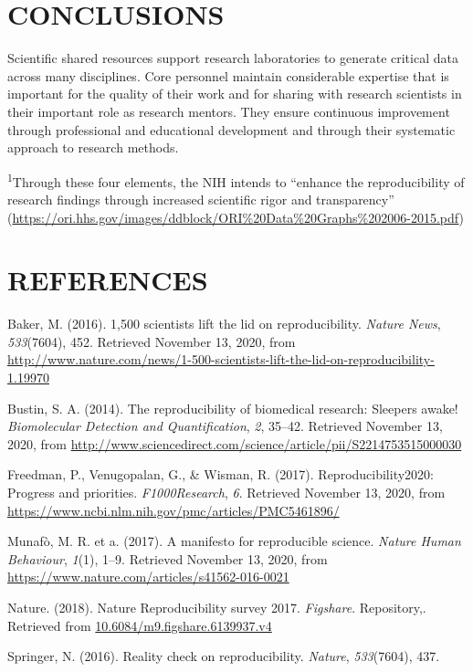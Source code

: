 \documentclass[]{article}
\begin{document}
\section{CONCLUSIONS}\label{conclusions}

Scientific shared resources support research laboratories to generate
critical data across many disciplines. Core personnel maintain
considerable expertise that is important for the quality of their work
and for sharing with research scientists in their important role as
research mentors. They ensure continuous improvement through
professional and educational development and through their systematic
approach to research methods.

\textsuperscript{1}Through these four elements, the NIH intends to
``enhance the reproducibility of research findings through increased
scientific rigor and transparency''
(\url{https://ori.hhs.gov/images/ddblock/ORI\%20Data\%20Graphs\%202006-2015.pdf})

\section*{REFERENCES}\label{references}

\hypertarget{refs}{}
\hypertarget{ref-baker_1500_2016}{}
Baker, M. (2016). 1,500 scientists lift the lid on reproducibility.
\emph{Nature News}, \emph{533}(7604), 452. Retrieved November 13, 2020,
from
\url{http://www.nature.com/news/1-500-scientists-lift-the-lid-on-reproducibility-1.19970}

\hypertarget{ref-bustin_reproducibility_2014}{}
Bustin, S. A. (2014). The reproducibility of biomedical research:
Sleepers awake! \emph{Biomolecular Detection and Quantification},
\emph{2}, 35--42. Retrieved November 13, 2020, from
\url{http://www.sciencedirect.com/science/article/pii/S2214753515000030}

\hypertarget{ref-freedman_reproducibility2020_2017}{}
Freedman, P., Venugopalan, G., \& Wisman, R. (2017).
Reproducibility2020: Progress and priorities. \emph{F1000Research},
\emph{6}. Retrieved November 13, 2020, from
\url{https://www.ncbi.nlm.nih.gov/pmc/articles/PMC5461896/}

\hypertarget{ref-munafo_manifesto_2017}{}
Munafò, M. R. et a. (2017). A manifesto for reproducible science.
\emph{Nature Human Behaviour}, \emph{1}(1), 1--9. Retrieved November 13,
2020, from \url{https://www.nature.com/articles/s41562-016-0021}

\hypertarget{ref-nature_nature_2018}{}
Nature. (2018). Nature Reproducibility survey 2017. \emph{Figshare}.
Repository,. Retrieved from \url{10.6084/m9.figshare.6139937.v4}

\hypertarget{ref-springer_reality_2016}{}
Springer, N. (2016). Reality check on reproducibility. \emph{Nature},
\emph{533}(7604), 437.
\end{document}
